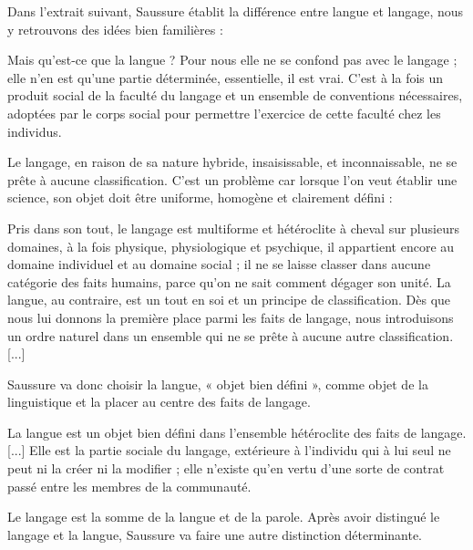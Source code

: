 Dans l’extrait suivant, Saussure établit la différence entre langue et langage, nous y retrouvons des idées bien familières :
\begin{lecture}{}
Mais qu’est-ce que la langue ? Pour nous elle ne se confond pas avec le langage ; elle n’en est qu’une partie déterminée, essentielle, il est vrai. C’est à la fois un produit social de la faculté du langage et un ensemble de conventions nécessaires, adoptées par le corps social pour permettre l’exercice de cette faculté chez les individus.
\end{lecture}

Le langage, en raison de sa nature hybride, insaisissable, et inconnaissable, ne se prête à aucune classification. C’est un problème car lorsque l’on veut établir une science, son objet doit être uniforme, homogène et clairement défini :
\begin{lecture}{}
Pris dans son tout, le langage est multiforme et hétéroclite à cheval sur plusieurs domaines, à la fois physique, physiologique et psychique, il appartient encore au domaine individuel et au domaine social ; il ne se laisse classer dans aucune catégorie des faits humains, parce qu’on ne sait comment dégager son unité. La langue, au contraire, est un tout en soi et un principe de classification. Dès que nous lui donnons la première place parmi les faits de langage, nous introduisons un ordre naturel dans un ensemble qui ne se prête à aucune autre classification. [...]
\end{lecture}

Saussure va donc choisir la langue, « objet bien défini », comme objet de la linguistique et la placer au centre des faits de langage.
\begin{lecture}{}
La langue est un objet bien défini dans l’ensemble hétéroclite des faits de langage. [...] Elle est la partie sociale du langage, extérieure à l’individu qui à lui seul ne peut ni la créer ni la modifier ; elle n’existe qu’en vertu d’une sorte de contrat passé entre les membres de la communauté.
\end{lecture}
Le langage est la somme de la langue et de la parole. Après avoir distingué le langage et la langue, Saussure va faire une autre distinction déterminante.

